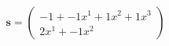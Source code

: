 \documentclass[preview]{standalone}
\begin{document}
\begin{align*}
\mathbf{s} = \begin{pmatrix}-1 + -1x^{1} + 1x^{2} + 1x^{3} \\ 2x^{1} + -1x^{2}\end{pmatrix}
\end{align*}
\end{document}
